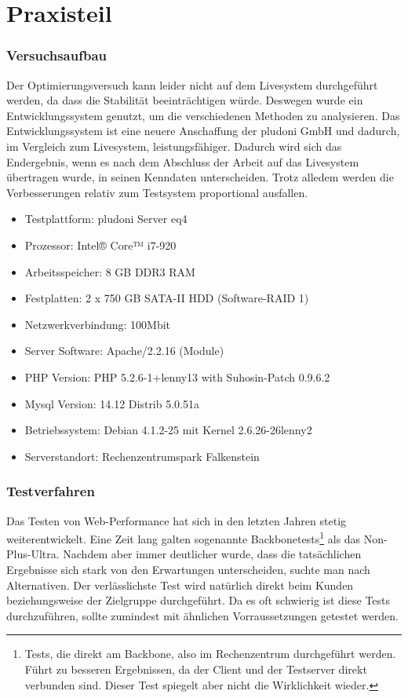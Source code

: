 \part{Praxisteil}

\section{Versuchsaufbau}
Der Optimierungsversuch kann leider nicht auf dem Livesystem durchgeführt werden, da dass die Stabilität beeinträchtigen würde. Deswegen wurde ein Entwicklungssystem genutzt, um die verschiedenen Methoden zu analysieren. Das Entwicklungssystem ist eine neuere Anschaffung der pludoni GmbH und dadurch, im Vergleich zum Livesystem, leistungsfähiger. Dadurch wird sich das Endergebnis, wenn es nach dem Abschluss der Arbeit auf das Livesystem übertragen wurde, in seinen Kenndaten unterscheiden. Trotz alledem werden die Verbesserungen relativ zum Testsystem proportional ausfallen. 

\begin{itemize}
 \item Testplattform: pludoni Server eq4
  \item Prozessor: Intel® Core™ i7-920 
  \item Arbeitsspeicher: 8 GB DDR3 RAM
  \item Festplatten: 2 x 750 GB SATA-II HDD (Software-RAID 1)
  \item Netzwerkverbindung: 100Mbit
  \item Server Software: Apache/2.2.16 (Module)
  \item PHP Version: PHP 5.2.6-1+lenny13 with Suhosin-Patch 0.9.6.2
  \item Mysql Version: 14.12 Distrib 5.0.51a 
  \item Betriebssystem: Debian 4.1.2-25 mit Kernel 2.6.26-26lenny2
  \item Serverstandort: Rechenzentrumspark Falkenstein
\end{itemize}

\section{Testverfahren}
Das Testen von Web-Performance hat sich in den letzten Jahren stetig weiterentwickelt. Eine Zeit lang galten sogenannte Backbonetests\footnote{Tests, die direkt am Backbone, also im Rechenzentrum durchgef\"uhrt werden. F\"uhrt zu besseren Ergebnissen, da der Client und der Testserver direkt verbunden sind. Dieser Test spiegelt aber nicht die Wirklichkeit wieder.} als das Non-Plus-Ultra. Nachdem aber immer deutlicher wurde, dass die tatsächlichen Ergebnisse sich stark von den Erwartungen unterscheiden, suchte man nach Alternativen. Der verlässlichste Test wird natürlich direkt beim Kunden beziehungsweise der Zielgruppe durchgeführt. Da es oft schwierig ist diese Tests durchzuführen, sollte zumindest mit ähnlichen Vorraussetzungen getestet werden.
